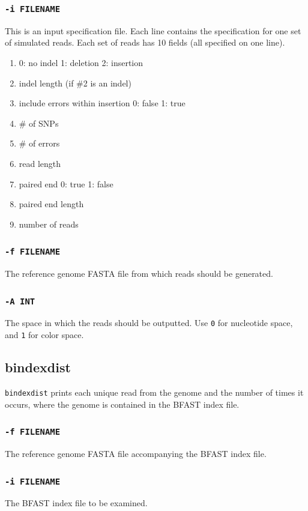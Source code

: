 \documentclass[a4paper,12pt]{book}
\newcommand{\TT}[1]{{\tt #1}} %
\newcommand{\rGFF}{reference genome FASTA file}
\newcommand{\BIF}{BFAST index file} %
\begin{document}
\subsubsection{\TT{-i FILENAME}}
This is an input specification file.
Each line contains the specification for one set of simulated reads.
Each set of reads has 10 fields (all specified on one line).
\begin{enumerate}
	\item 0: no indel 1: deletion 2: insertion
	\item indel length (if \#2 is an indel)
	\item include errors within insertion 0: false 1: true
	\item \# of SNPs
	\item \# of errors
	\item read length
	\item paired end 0: true 1: false
	\item paired end length
	\item number of reads
\end{enumerate}

\subsubsection{\TT{-f FILENAME}}
The \rGFF{} from which reads should be generated.

\subsubsection{\TT{-A INT}}
The space in which the reads should be outputted.
Use \TT{0} for nucleotide space, and \TT{1} for color space.

\subsection{bindexdist}
\label{sec:bindexdist}
\TT{bindexdist} prints each unique read from the genome and the number of times it occurs, where the genome is contained in the \BIF{}.

\subsubsection{\TT{-f FILENAME}}
The \rGFF{} accompanying the \BIF{}.

\subsubsection{\TT{-i FILENAME}}
The \BIF{} to be examined.
\end{document}
